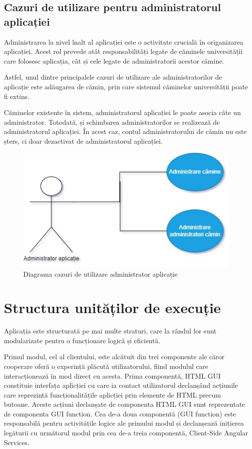 \documentclass[12pt,a4paper]{report}
\theoremstyle{definition}
\theoremstyle{remark}
\begin{document}
\subsection{Cazuri de utilizare pentru administratorul aplicației}
\par Administrarea la nivel înalt al aplicației este o activitate crucială în origanizarea aplicației. Acest rol prevede atât responsabilități legate de căminele universității care folosesc aplicația, cât și cele legate de administratorii acestor cămine.

\par Astfel, unul dintre principalele cazuri de utilizare ale administratorilor de aplicație este adăugarea de cămin, prin care sistemul căminelor universității poate fi extins.

\par Căminelor existente în sistem, administratorul aplicației le poate asocia câte un administrator. Totodată, și schimbarea administratorilor se realizează de administratorul aplicației. În acest caz, contul administratorului de cămin nu este șters, ci doar dezactivat de administratorul aplicației.

\begin{figure}[H]
    \centering
    \includegraphics[width=0.5\linewidth, height=0.2\textheight]{resurse/diagrame/UVTDorms_UseCaseAdministratorAplicatie.jpg}
    \caption{Diagrama cazuri de utilizare administrator aplicație}
\end{figure}

\section{Structura unităților de execuție}
\par Aplicația este structurată pe mai multe straturi, care la rândul lor sunt modularizate pentru o funcționare logică și eficientă.

\par Primul modul, cel al clientului, este alcătuit din trei componente ale căror cooperare oferă o experință plăcută utilizatorului, fiind modulul care interacționează în mod direct cu acesta. Prima componentă, HTML GUI constituie interfața aplicției cu care ia contact utilizatorul declanșând acțiunile care reprezintă funcționalitățile aplicției prin elemente de HTML precum butoane. Aceste acțiuni declanșate de componenta HTML GUI sunt reprezentate de componenta GUI function. Cea de-a doua componentă (GUI function) este responsabilă pentru activitățile logice ale primului modul și declanșează inițierea legăturii cu următorul modul prin cea de-a treia componentă, Client-Side Angular Services.
\end{document}
